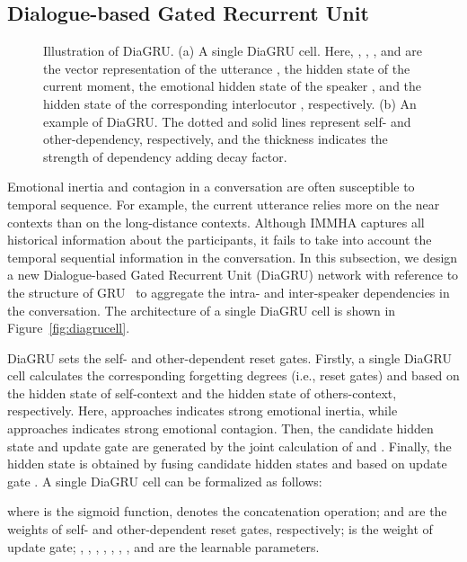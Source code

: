 \documentclass{SCIS2019}
\begin{document}
\subsection{Dialogue-based Gated Recurrent Unit}
\begin{figure}[htbp]
	\centering
	\captionsetup[subfigure]{}
	\caption{Illustration of DiaGRU. (a) A single DiaGRU cell. Here, , , , and  are the vector representation of the utterance , the hidden state of the current moment, the emotional hidden state of the speaker , and the hidden state of the corresponding interlocutor , respectively. (b) An example of DiaGRU. The dotted and solid lines represent self- and other-dependency, respectively, and the thickness indicates the strength of dependency adding decay factor.}
	\label{fig:diagrus}
\end{figure}
Emotional inertia and contagion in a conversation are often susceptible to temporal sequence. For example, the current utterance relies more on the near contexts than on the long-distance contexts. Although IMMHA captures all historical information about the participants, it fails to take into account the temporal sequential information in the conversation. In this subsection, we design a new Dialogue-based Gated Recurrent Unit (DiaGRU) network with reference to the structure of GRU~\cite{chung2014empirical} to aggregate the intra- and inter-speaker dependencies in the conversation. The architecture of a single DiaGRU cell is shown in Figure~\ref{fig:diagrucell}.

DiaGRU sets the self- and other-dependent reset gates. Firstly, a single DiaGRU cell calculates the corresponding forgetting degrees (i.e., reset gates)  and  based on the hidden state  of self-context and the hidden state  of others-context, respectively. Here,  approaches  indicates strong emotional inertia, while  approaches  indicates strong emotional contagion. Then, the candidate hidden state  and update gate  are generated by the joint calculation of  and . Finally, the hidden state  is obtained by fusing candidate hidden states  and  based on update gate . A single DiaGRU cell can be formalized as follows:

where  is the sigmoid function,  denotes the concatenation operation;  and  are the weights of self- and other-dependent reset gates, respectively;  is the weight of update gate; , , , , , , , and  are the learnable parameters.
\end{document}
